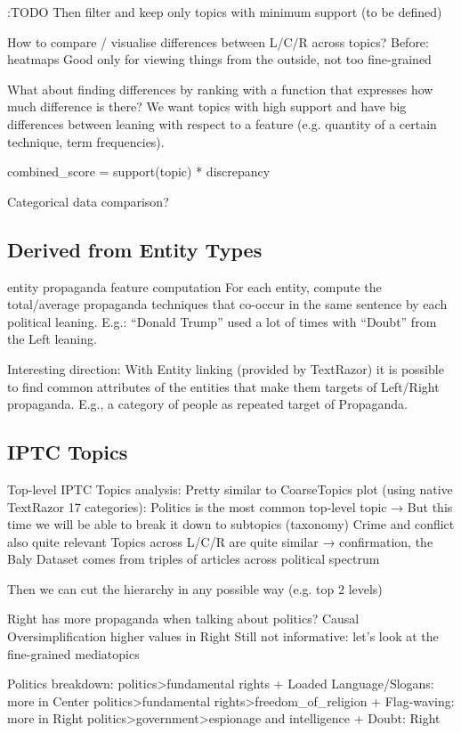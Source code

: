 :TODO
Then filter and keep only topics with minimum support (to be defined)

How to compare / visualise differences between L/C/R across topics?
Before: heatmaps
Good only for viewing things from the outside, not too fine-grained

What about finding differences by ranking with a function that expresses how much difference is there?
We want topics with high support and have big differences between leaning with respect to a feature (e.g. quantity of a certain technique, term frequencies).

combined\_score = support(topic) * discrepancy

Categorical data comparison?



\subsection{Derived from Entity Types}

entity propaganda feature computation
For each entity, compute the total/average propaganda techniques that co-occur in the same sentence by each political leaning. E.g.: “Donald Trump” used a lot of times with “Doubt” from the Left leaning.

Interesting direction:
With Entity linking (provided by TextRazor) it is possible to find common attributes of the entities that make them targets of Left/Right propaganda. E.g., a category of people as repeated target of Propaganda.

\subsection{IPTC Topics}

Top-level IPTC Topics analysis:
Pretty similar to CoarseTopics plot (using native TextRazor 17 categories):
Politics is the most common top-level topic → But this time we will be able to break it down to subtopics (taxonomy)
Crime and conflict also quite relevant
Topics across L/C/R are quite similar → confirmation, the Baly Dataset comes from triples of articles across political spectrum

Then we can cut the hierarchy in any possible way (e.g. top 2 levels)

Right has more propaganda when talking about politics?
Causal Oversimplification higher values in Right
Still not informative: let’s look at the fine-grained mediatopics

Politics breakdown:
politics>fundamental rights + Loaded Language/Slogans: more in Center
politics>fundamental rights>freedom\_of\_religion + Flag-waving: more in Right
politics>government>espionage and intelligence + Doubt: Right

